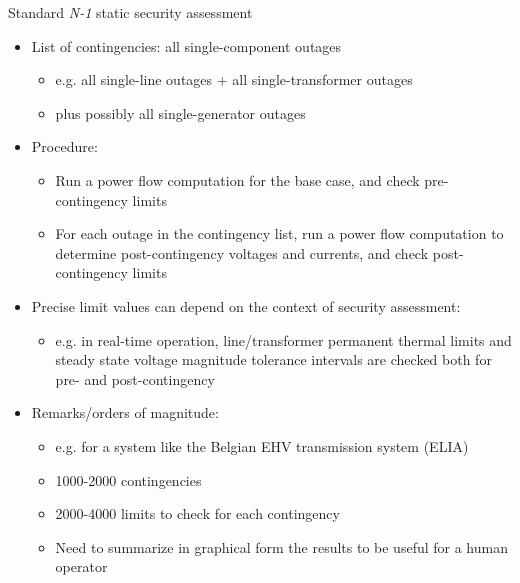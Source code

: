 \begin{frame}[allowframebreaks]{Standard \textit{N-1} static security assessment}
    \begin{itemize}
        \item List of contingencies: all single-component outages
        \begin{itemize}
            \item e.g. all single-line outages + all single-transformer outages
            \item plus possibly all single-generator outages
        \end{itemize}
        \item Procedure:
        \begin{itemize}
            \item Run a power flow computation for the base case, and check pre-contingency limits
            \item For each outage in the contingency list, run a power flow computation to determine post-contingency voltages and currents, and check post-contingency limits
        \end{itemize}
        \item Precise limit values can depend on the context of security assessment:
        \begin{itemize}
            \item e.g. in real-time operation, line/transformer permanent thermal limits and steady state voltage magnitude tolerance intervals are checked both for pre- and post-contingency
        \end{itemize}
        \item Remarks/orders of magnitude:
        \begin{itemize}
            \item e.g. for a system like the Belgian EHV transmission system (ELIA)
            \item 1000-2000 contingencies
            \item 2000-4000 limits to check for each contingency
            \item Need to summarize in graphical form the results to be useful for a human operator
        \end{itemize}
    \end{itemize}
\end{frame}

